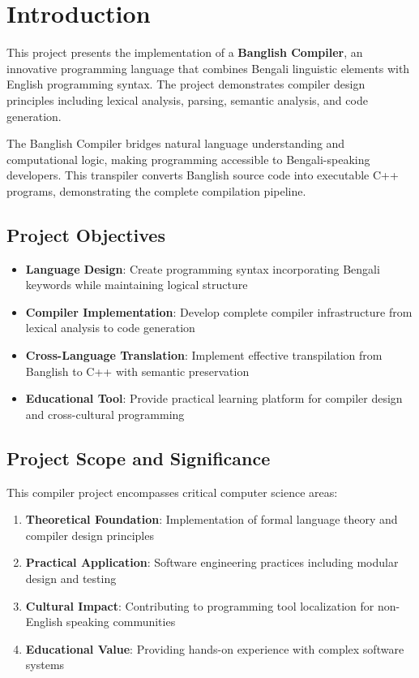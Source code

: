 \documentclass[12pt,a4paper]{article}
\begin{document}
\tableofcontents
\thispagestyle{fancy}
\clearpage

\section{Introduction}

This project presents the implementation of a \textbf{Banglish Compiler}, an innovative programming language that combines Bengali linguistic elements with English programming syntax. The project demonstrates compiler design principles including lexical analysis, parsing, semantic analysis, and code generation.

The Banglish Compiler bridges natural language understanding and computational logic, making programming accessible to Bengali-speaking developers. This transpiler converts Banglish source code into executable C++ programs, demonstrating the complete compilation pipeline.

\subsection{Project Objectives}

\begin{itemize}[leftmargin=*,itemsep=3pt]
    \item \textbf{Language Design}: Create programming syntax incorporating Bengali keywords while maintaining logical structure
    \item \textbf{Compiler Implementation}: Develop complete compiler infrastructure from lexical analysis to code generation
    \item \textbf{Cross-Language Translation}: Implement effective transpilation from Banglish to C++ with semantic preservation
    \item \textbf{Educational Tool}: Provide practical learning platform for compiler design and cross-cultural programming
\end{itemize}

\subsection{Project Scope and Significance}

This compiler project encompasses critical computer science areas:

\begin{enumerate}[leftmargin=*,itemsep=3pt]
    \item \textbf{Theoretical Foundation}: Implementation of formal language theory and compiler design principles
    \item \textbf{Practical Application}: Software engineering practices including modular design and testing
    \item \textbf{Cultural Impact}: Contributing to programming tool localization for non-English speaking communities
    \item \textbf{Educational Value}: Providing hands-on experience with complex software systems
\end{enumerate}
\end{document}

